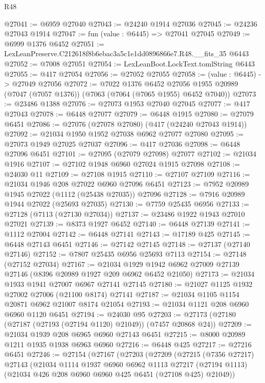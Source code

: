 \begin{lexlean}{R48}
\begin{coremodule}
@27041 := @6959 @27040
@27043 := @24240 @1914 @27036
@27045 := @24236 @27043 @1914
@27047 := fun (value : @6445) => @27041 @27045
@27049 := @6999 @1376 @6452
@27051 := LexLeanPreserve.C212618f8b6ebac3a5c1e1dd0896866e7.R48.__fits_35 @6443
@27052 := @7008 @27051
@27054 := LexLeanBoot.LockText.tomlString @6443
@27055 := @417 @27054
@27056 := @27052 @27055
@27058 := (value : @6445) -> @27049 @27056
@27072 := @7022
    @1376
    @6452
    @27056
    @1955
    @20989
    (@7047 (@7057 @1376))
    (@7063 (@7064 (@7065 @1955) @6452 @7040))
@27073 := @23486 @1388
@27076 := @27073 @1953 @27040 @27045
@27077 := @417 @27043
@27078 := @6448 @27077
@27079 := @6448 @1915
@27080 := @27079 @6451
@27086 := @27076 (@27078 @27080) (@417 (@24240 @27043 @1914))
@27092 := @21034 @1950 @1952 @27038 @6962 @27077 @27080
@27095 := @27073 @1949 @27025 @27037
@27096 := @417 @27036
@27098 := @6448 @27096 @6451
@27101 := @27095 (@27079 @27098) @27077
@27102 := @21034 @1916
@27107 := @27102 @1948 @6960 @27024 @1915 @27098
@27108 := @24030 @11
@27109 := @27108 @1915
@27110 := @27107 @27109
@27116 := @21034 @1946 @208 @27022 @6960 @27096 @6451
@27123 := @7952 @20989 @1945 @27022 (@1112 (@25438 @27035)) @27096
@27128 := @7916 @20989 @1944 @27022 (@25693 @27035)
@27130 := @7759 @25435 @6956
@27133 := @27128 (@7113 (@27130 @27034))
@27137 := @23486 @1922 @1943 @27010 @27021
@27139 := @8373 @1927 @6452
@27140 := @6448 @27139
@27141 := @1112 @27004
@27142 := @6448 @27141
@27143 := @17189 @425
@27145 := @6448 @27143 @6451
@27146 := @27142 @27145
@27148 := @27137 (@27140 @27146)
@27152 := @7807 @25435 @6956 @25693 @7113
@27154 := @27148 (@27152 @27034)
@27167 := @21034 @1929 @1942 @6962 @27009 @27139 @27146 (@8396 @20989 @1927 @209 @6962 @6452 @21050)
@27173 := @21034 @1933 @1941 @27007 @6967 @27141 @27145
@27180 := @21027 @1125 @1932 @27002 @27006 (@21100 @8174) @27141
@27187 := @21034 @1105 @1154 @20871 @6962 @21007 @8174 @21054
@27193 := @21034 @1121 @208 @6960 @6960 @1120 @6451
@27194 := @24030 @95
@27203 := @27173 (@27180 (@27187 (@27193 (@27194 @1120) @21049)) (@7457 @20868 @24))
@27209 := @21034 @1939 @208 @6965 @6960 @27143 @6451
@27215 := @8000 @20989 @1211 @1935 @1938 @6963 @6960
@27216 := @6448 @425
@27217 := @27216 @6451
@27246 := @27154
    (@27167
      (@27203
        (@27209
          (@27215
            (@7356 @27217)
            @27143
            (@21034
              @1114
              @1937
              @6960
              @6962
              @1113
              @27217
              (@27194 @1113)
              (@21034 @426 @208 @6960 @6960 @425 @6451 (@27108 @425) @21049))

\end{coremodule}
\end{lexlean}
